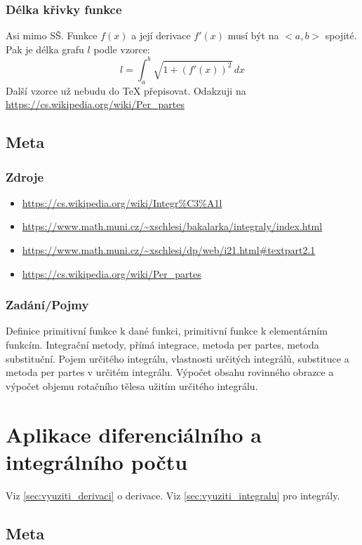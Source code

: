 \documentclass[12pt]{article}
\begin{document}
\subsubsection{Délka křivky funkce}
Asi mimo SŠ. Funkce $f(x)$ a její derivace $f'(x)$ musí být na $<a, b>$ spojité. Pak je délka grafu $l$ podle vzorce:
\begin{equation}
l = \int_a^b \sqrt{1+(f'(x))^2}\,d x
\end{equation}
Další vzorce už nebudu do TeX přepisovat. Odakzuji na \url{https://cs.wikipedia.org/wiki/Per_partes}

\subsection{Meta}
\subsubsection{Zdroje}
\begin{itemize}
\item \url{https://cs.wikipedia.org/wiki/Integr\%C3\%A1l}
\item \url{https://www.math.muni.cz/~xschlesi/bakalarka/integraly/index.html}
\item \url{https://www.math.muni.cz/~xschlesi/dp/web/i21.html#textpart2.1}
\item \url{https://cs.wikipedia.org/wiki/Per_partes}
\end{itemize}
\subsubsection{Zadání/Pojmy}
Definice primitivní funkce k dané funkci, primitivní funkce k elementárním funkcím. Integrační metody, přímá integrace, metoda per partes, metoda substituční. Pojem určitého integrálu, vlastnosti určitých integrálů, substituce a metoda per partes v určitém integrálu. Výpočet obsahu rovinného obrazce a výpočet objemu rotačního tělesa užitím určitého integrálu.

\section{Aplikace diferenciálního a integrálního počtu}
Viz \ref{sec:vyuziti_derivaci} o derivace. Viz \ref{sec:vyuziti_integralu} pro integrály.
\subsection{Meta}
\end{document}
